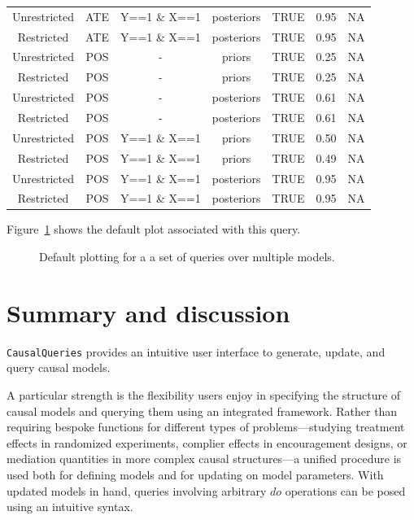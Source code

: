 \documentclass[
  11pt,
  article]{jss}
\begin{document}
\begin{longtable}[t]{ccccccc}
Unrestricted & ATE & Y==1 \& X==1 & posteriors & TRUE & 0.95 & NA\\
Restricted & ATE & Y==1 \& X==1 & posteriors & TRUE & 0.95 & NA\\
Unrestricted & POS & - & priors & TRUE & 0.25 & NA\\
\addlinespace
Restricted & POS & - & priors & TRUE & 0.25 & NA\\
Unrestricted & POS & - & posteriors & TRUE & 0.61 & NA\\
Restricted & POS & - & posteriors & TRUE & 0.61 & NA\\
Unrestricted & POS & Y==1 \& X==1 & priors & TRUE & 0.50 & NA\\
Restricted & POS & Y==1 \& X==1 & priors & TRUE & 0.49 & NA\\
\addlinespace
Unrestricted & POS & Y==1 \& X==1 & posteriors & TRUE & 0.95 & NA\\
Restricted & POS & Y==1 \& X==1 & posteriors & TRUE & 0.95 & NA\\
\bottomrule

\end{longtable}

Figure~\ref{fig-batch-query} shows the default plot associated with this
query.

\begin{figure}


\caption{\label{fig-batch-query}Default plotting for a a set of queries
over multiple models.}

\end{figure}%

\section{Summary and discussion}\label{summary-and-discussion}

\texttt{CausalQueries} provides an intuitive user interface to generate,
update, and query causal models.

A particular strength is the flexibility users enjoy in specifying the
structure of causal models and querying them using an integrated
framework. Rather than requiring bespoke functions for different types
of problems---studying treatment effects in randomized experiments,
complier effects in encouragement designs, or mediation quantities in
more complex causal structures---a unified procedure is used both for
defining models and for updating on model parameters. With updated
models in hand, queries involving arbitrary \(do\) operations can be
posed using an intuitive syntax.
\end{document}
